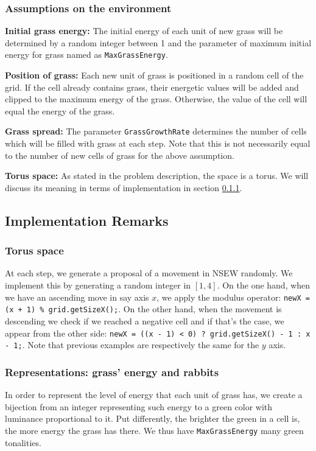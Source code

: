 \documentclass[11pt]{article}
\begin{document}
\subsubsection{Assumptions on the \textbf{environment}}

\textbf{Initial grass energy: }The initial energy of each unit of new grass will be determined by a random integer between 1 and the parameter of maximum initial energy for grass named as \texttt{MaxGrassEnergy}.
    
\textbf{Position of grass: } Each new unit of grass is positioned in a random cell of the grid. If the cell already contains grass, their energetic values will be added and clipped to the maximum energy of the grass. Otherwise, the value of the cell will equal the energy of the grass.
    
\textbf{Grass spread: }The parameter \texttt{GrassGrowthRate} determines the number of cells which will be filled with grass at each step. Note that this is not necessarily equal to the number of new cells of grass for the above assumption.
    
\textbf{Torus space: }As stated in the problem description, the space is a torus. We will discuss its meaning in terms of implementation in section \ref{sec:imp-remarks}.



\subsection{Implementation Remarks}

\subsubsection{Torus space}
\label{sec:imp-remarks}
At each step, we generate a proposal of a movement in NSEW randomly. We implement this by generating a random integer in $[1,4]$. On the one hand, when we have an ascending move in say axis $x$, we apply the modulus operator: \texttt{newX = (x + 1) \% grid.getSizeX();}. On the other hand, when the movement is descending we check if we reached a negative cell and if that's the case, we appear from the other side: \texttt{newX = ((x - 1) < 0) ? grid.getSizeX() - 1 : x - 1;}. Note that previous examples are respectively the same for the $y$ axis.

\subsubsection{Representations: grass' energy and rabbits}
In order to represent the level of energy that each unit of grass has, we create a bijection from an integer representing such energy to a green color with luminance proportional to it. Put differently, the brighter the green in a cell is, the more energy the grass has there. We thus have \texttt{MaxGrassEnergy} many green tonalities.
\end{document}
